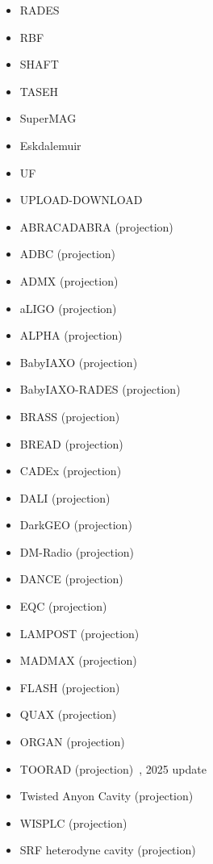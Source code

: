 \documentclass[8pt,twocolumn]{extarticle}
\begin{document}
\begin{mdframed}[everyline=true]
\begin{itemize}
    \item RADES~\cite{CAST:2020rlf,Ahyoune:2024klt}
    \item RBF~\cite{DePanfilis,Wuensch:1989sa}
    \item SHAFT~\cite{Gramolin:2020ict}
    \item TASEH~\cite{TASEH:2022vvu}
    \item SuperMAG~\cite{Arza:2021ekq,Friel:2024shg}
    \item Eskdalemuir~\cite{Nishizawa:2025xka}
    \item UF~\cite{Hagmann,Hagmann:1996qd}
    \item UPLOAD-DOWNLOAD~\cite{Thomson:2019aht,Thomson:2023moc}
    \item ABRACADABRA (projection)~\cite{ABRACADABRA}
	\item ADBC (projection)~\cite{Liu:2018icu} 
	\item ADMX (projection)~\cite{Graham:2015ouw}
              \item aLIGO (projection)~\cite{Nagano:2019rbw} 
           \item ALPHA (projection)~\cite{Lawson:2019brd,Millar:2022peq} 
           \item BabyIAXO (projection)~\cite{IAXO:2024wss}
           \item BabyIAXO-RADES (projection)~\cite{Ahyoune:2023gfw}
           \item BRASS (projection)~\cite{BRASS}
           \item BREAD (projection)~\cite{Liu:2021pei}
           \item CADEx (projection)~\cite{Aja:2022csb}
           \item DALI (projection)~\cite{DeMiguel:2023nmz}
           \item DarkGEO (projection)~\cite{Heinze:2024bdc}
    \item DM-Radio (projection)~\cite{DMRadio,DMRadio:2022pkf}
     \item DANCE (projection)~\cite{Obata:2018vvr} 
     \item EQC (projection)~\cite{Fan:2024mhm}
           \item LAMPOST (projection)~\cite{Baryakhtar:2018doz} 
      \item MADMAX (projection)~\cite{Beurthey:2020yuq} 
           \item FLASH (projection)~\cite{Alesini:2017ifp,Alesini:2023qed} 
           \item QUAX (projection)~\cite{QUAX} 
                 \item ORGAN (projection)~\cite{McAllister:2017lkb} 
                       \item TOORAD (projection)~\cite{Schutte-Engel:2021bqm}, 2025 update~\cite{Qiu:2025bbi}
                       \item Twisted Anyon Cavity (projection)~\cite{Bourhill:2022alm}
                       \item WISPLC (projection)~\cite{Zhang:2021bpa} 
                       \item SRF heterodyne cavity (projection)~\cite{Berlin:2020vrk}


\end{itemize}
\end{mdframed}
\end{document}
